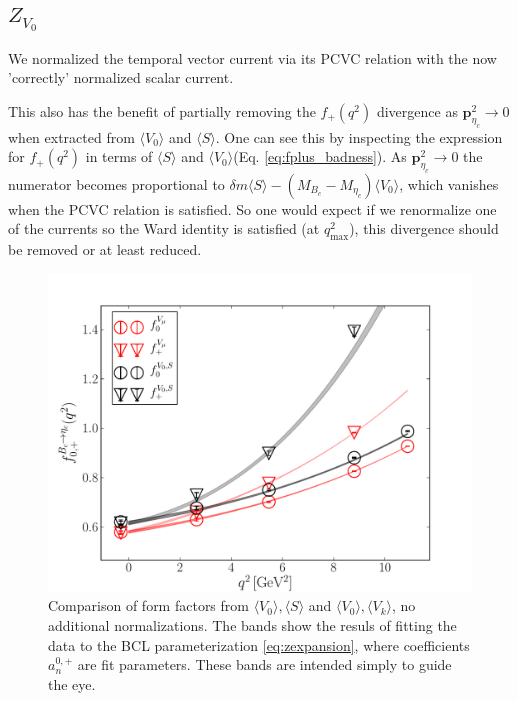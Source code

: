 \subsection{$Z_{V_0}$}
\label{sec:ZV0}

We normalized the temporal vector current via its PCVC relation with the now 'correctly' normalized scalar current.

This also has the benefit of partially removing the $f_+(q^2)$ divergence as ${\textbf{p}}^2_{\eta_c}\to 0$ when extracted from $\langle V_0 \rangle$ and $\langle S \rangle$. One can see this by inspecting the expression for $f_+(q^2)$ in terms of $\langle S \rangle$ and $\langle V_0 \rangle$(Eq. \eqref{eq:fplus_badness}). As ${\textbf{p}}_{\eta_c}^2 \to 0$ the numerator becomes proportional to $\delta m \langle S \rangle - (M_{B_c}-M_{\eta_c}) \langle V_0 \rangle$, which vanishes when the PCVC relation is satisfied. So one would expect if we renormalize one of the currents so the Ward identity is satisfied (at $q^2_{\text{max}}$), this divergence should be removed or at least reduced.

\begin{figure}[htb!]
\centering
\includegraphics[scale=0.55]{images/nrqcd/Bcetac_bothways_1.pdf}
\caption{Comparison of form factors from $\langle V_0 \rangle, \langle S \rangle$ and $\langle V_0 \rangle,\langle V_k \rangle$, no additional normalizations. The bands show the resuls of fitting the data to the BCL parameterization \eqref{eq:zexpansion}, where coefficients $a^{0,+}_n$ are fit parameters. These bands are intended simply to guide the eye. \label{fig:naive}}
\end{figure}

